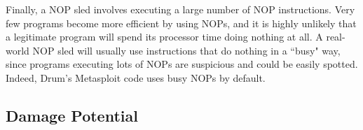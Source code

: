 

Finally, a NOP sled involves executing a large number of NOP instructions. Very few programs become more efficient by
using NOPs\cite{zip_quine}, and it is highly unlikely that a legitimate program will spend its processor time doing
nothing at all. A real-world NOP sled will usually use instructions that do nothing in a ``busy" way\cite{wiki_sled},
since programs executing lots of NOPs are suspicious and could be easily spotted. Indeed, Drum's Metasploit code uses
busy NOPs by default.

\subsection{Damage Potential}

